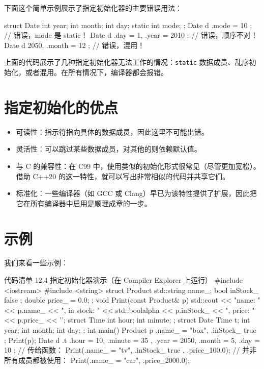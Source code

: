 下面这个简单示例展示了指定初始化器的主要错误用法：

\begin{codebox}[cpp]
struct Date {
int year;
int month;
int day;
static int mode;
};
Date d { .mode = 10 };
// 错误，mode 是 static！
Date d { .day = 1, .year = 2010 }; // 错误，顺序不对！
Date d { 2050, .month = 12 };
// 错误，混用！
\end{codebox}

上面的代码展示了几种指定初始化器无法工作的情况：\texttt{static} 数据成员、乱序初始化，或者混用。在所有情况下，编译器都会报错。

\section{指定初始化的优点}

\begin{itemize}
\item 可读性：指示符指向具体的数据成员，因此这里不可能出错。
\item 灵活性：可以跳过某些数据成员，对其他的则依赖默认值。
\item 与 C 的兼容性：在 C99 中，使用类似的初始化形式很常见（尽管更加宽松）。借助 C++20 的这一特性，就可以写出非常相似的代码并共享它们。
\item 标准化：一些编译器（如 GCC 或 Clang）早已为该特性提供了扩展，因此把它在所有编译器中启用是顺理成章的一步。
\end{itemize}

\section{示例}

我们来看一些示例：

\begin{codeboxt}[cpp]{代码清单 12.4 指定初始化器演示（在 Compiler Explorer 上运行）}
#include <iostream>
#include <string>
struct Product {
std::string name_;
bool inStock_ { false };
double price_ = 0.0;
};
void Print(const Product& p) {
std::cout << "name: " << p.name_ << ", in stock: "
<< std::boolalpha << p.inStock_ << ", price: "
<< p.price_ << '\n';
}
struct Time { int hour; int minute; };
struct Date { Time t; int year; int month; int day; };
int main() {
Product p { .name_ = "box", .inStock_ {true }};
Print(p);
Date d { .t { .hour = 10, .minute = 35 },
.year = 2050, .month = 5, .day = 10 };
// 传给函数：
Print({.name_ = "tv", .inStock_ {true }, .price_{100.0}});
// 并非所有成员都被使用：
Print({.name_ = "car", .price_{2000.0}});
}
\end{codeboxt}

